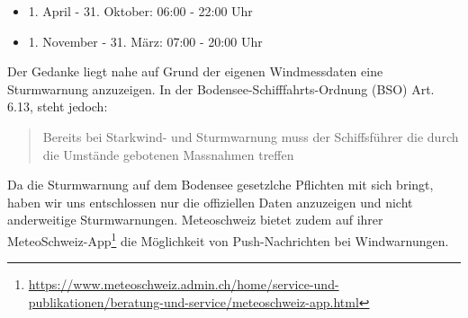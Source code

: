 \begin{itemize}
\item 1. April - 31. Oktober: 06:00 - 22:00 Uhr
\item 1. November - 31. März: 07:00 - 20:00 Uhr
\end{itemize}

\noindent
Der Gedanke liegt nahe auf Grund der eigenen Windmessdaten eine Sturmwarnung anzuzeigen. In der Bodensee-Schifffahrts-Ordnung (BSO) Art. 6.13, steht jedoch:

\begin{quote}
\flqq Bereits bei Starkwind- und Sturmwarnung muss der Schiffsführer die durch die Umstände gebotenen Massnahmen treffen \frqq
\end{quote}

\noindent
 Da die Sturmwarnung auf dem Bodensee gesetzlche Pflichten mit sich bringt, haben wir uns entschlossen nur die offiziellen Daten anzuzeigen und nicht anderweitige Sturmwarnungen. Meteoschweiz bietet zudem auf ihrer MeteoSchweiz-App\footnote{ \url{https://www.meteoschweiz.admin.ch/home/service-und-publikationen/beratung-und-service/meteoschweiz-app.html}} die Möglichkeit von Push-Nachrichten bei Windwarnungen.














